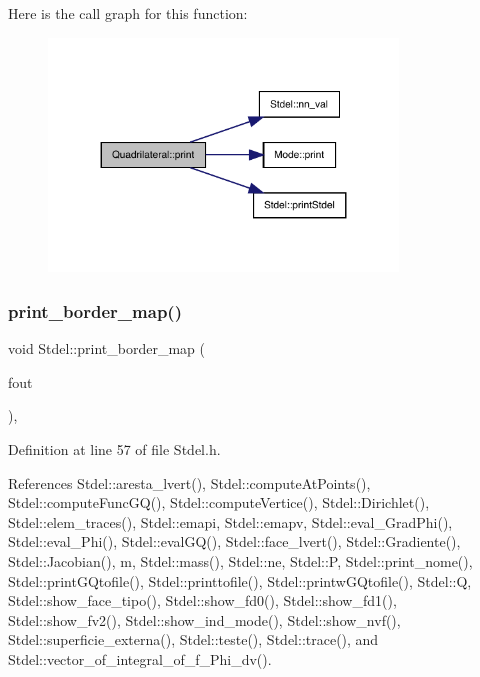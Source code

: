 Here is the call graph for this function\+:
\nopagebreak
\begin{figure}[H]
\begin{center}
\leavevmode
\includegraphics[width=263pt]{classQuadrilateral_a6d1ef249f5359f422028e0635ccf1da7_cgraph}
\end{center}
\end{figure}
\mbox{\label{classStdel_a9a0c69dca7564f6ca4aa4f3c9864ea01}} 
\subsubsection{\texorpdfstring{print\+\_\+border\+\_\+map()}{print\_border\_map()}}
{\footnotesize\ttfamily void Stdel\+::print\+\_\+border\+\_\+map (\begin{DoxyParamCaption}\item[{F\+I\+LE $\ast$}]{fout }\end{DoxyParamCaption})\hspace{0.3cm}{\ttfamily [inline]}, {\ttfamily [inherited]}}



Definition at line 57 of file Stdel.\+h.



References Stdel\+::aresta\+\_\+lvert(), Stdel\+::compute\+At\+Points(), Stdel\+::compute\+Func\+G\+Q(), Stdel\+::compute\+Vertice(), Stdel\+::\+Dirichlet(), Stdel\+::elem\+\_\+traces(), Stdel\+::emapi, Stdel\+::emapv, Stdel\+::eval\+\_\+\+Grad\+Phi(), Stdel\+::eval\+\_\+\+Phi(), Stdel\+::eval\+G\+Q(), Stdel\+::face\+\_\+lvert(), Stdel\+::\+Gradiente(), Stdel\+::\+Jacobian(), m, Stdel\+::mass(), Stdel\+::ne, Stdel\+::P, Stdel\+::print\+\_\+nome(), Stdel\+::print\+G\+Qtofile(), Stdel\+::printtofile(), Stdel\+::printw\+G\+Qtofile(), Stdel\+::Q, Stdel\+::show\+\_\+face\+\_\+tipo(), Stdel\+::show\+\_\+fd0(), Stdel\+::show\+\_\+fd1(), Stdel\+::show\+\_\+fv2(), Stdel\+::show\+\_\+ind\+\_\+mode(), Stdel\+::show\+\_\+nvf(), Stdel\+::superficie\+\_\+externa(), Stdel\+::teste(), Stdel\+::trace(), and Stdel\+::vector\+\_\+of\+\_\+integral\+\_\+of\+\_\+f\+\_\+\+Phi\+\_\+dv().

